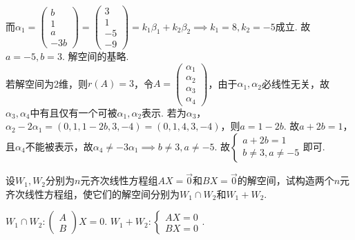 \begin{exercise}
\begin{exgroup}
\begin{answer}
        而$\alpha_1=\begin{pmatrix}
                b \\
                1 \\
                a \\
                -3b
            \end{pmatrix}=\begin{pmatrix}
                3  \\
                1  \\
                -5 \\
                -9
            \end{pmatrix}=k_1\beta_1+k_2\beta_2\implies k_1=8,k_2=-5$成立. 故$a=-5,b=3$. 解空间的基略.\\
        若解空间为2维，则$r(A)=3$，令$A=\begin{pmatrix}
                \alpha_1 \\
                \alpha_2 \\
                \alpha_3 \\
                \alpha_4
            \end{pmatrix}$，由于$\alpha_1,\alpha_2$必线性无关，故$\alpha_3,\alpha_4$中有且仅有一个可被$\alpha_1,\alpha_2$表示. 若为$\alpha_3$，$\alpha_2-2\alpha_1=(0,1,1-2b,3,-4)=(0,1,4,3,-4)$，则$a=1-2b$. 故$a+2b=1$，且$\alpha_4$不能被表示，故$\alpha_4\neq -3\alpha_1\implies b\neq 3, a\neq -5$. 故$\begin{cases}
                a+2b=1 \\
                b\neq 3, a\neq -5
            \end{cases}$即可.
        \end{answer}

        \item 设$W_1,W_2$分别为$n$元齐次线性方程组$AX=\vec{0}$和$BX=\vec{0}$的解空间，试构造两个$n$元齐次线性方程组，使它们的解空间分别为$W_1 \cap W_2$和$W_1+W_2$.
        \begin{answer}
            $W_1\cap W_2:\begin{pmatrix}
                  A \\ B
              \end{pmatrix}X=0$. \qquad
          $W_1+ W_2:\begin{cases}
                  AX = 0 \\
                  BX = 0
              \end{cases}$.
        \end{answer}


\end{exgroup}
\end{exercise}
